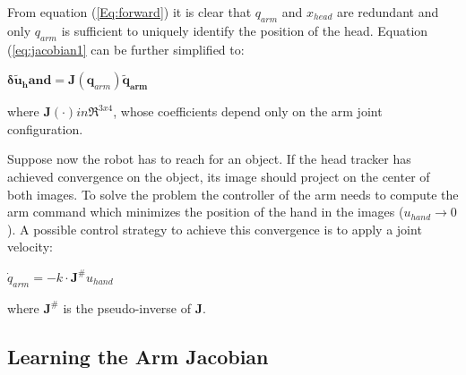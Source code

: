 From equation (\ref{Eq:forward}) it is clear that 
$q_{arm}$ and $x_{head}$ are redundant and only $q_{arm}$ is 
sufficient to uniquely identify the position of the head. Equation
(\ref{eq:jacobian1} can be further simplified to:
%
\begin{center} 
\begin{math}
\label{eq:jacobian3}
  \mathbf{\delta \tilde{u}_hand}=
  \mathbf J\left(\mathbf q_{arm}\right)
  \mathbf{\tilde{q}_{arm}}
\end{math}
\end{center}
%
where $\mathbf J(\cdot) in \mathbb \Re^{3x4}$, whose coefficients depend 
only on the arm joint configuration.

Suppose now the robot has to reach for an object. If the head tracker
has achieved convergence on the object, its image should project on 
the center of both images. To solve the problem the controller of the 
arm needs to compute the arm command which minimizes the position of the
hand in the images ($u_{hand} \rightarrow 0$). A possible control strategy
to achieve this convergence is to apply a joint velocity:
%
\begin{center}
\begin{math}
\dot q_{arm}=-k \cdot \mathbf J^{\#} u_{hand}
\end{math}
\end{center}
%
where $\mathbf J^{\#}$ is the pseudo-inverse of $\mathbf J$.

\subsection{Learning the Arm Jacobian}
%